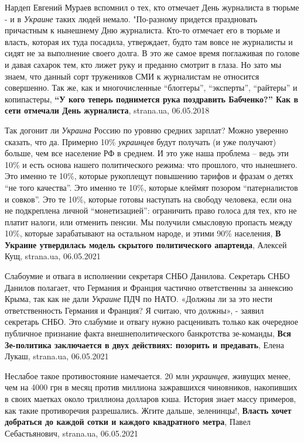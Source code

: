 Нардеп Евгений Мураев вспомнил о тех, кто отмечает День журналиста в тюрьме - и
в \emph{Украине} таких людей немало.  "По-разному придется праздновать
причастным к нынешнему Дню журналиста. Кто-то отмечает его в тюрьме и власть,
которая их туда посадила, утверждает, будто там вовсе не журналисты и сидят не
за выполнение своего долга. В это же самое время поглаживая по голове и давая
сахарок тем, кто лижет руку и преданно смотрит в глаза. Но зато мы знаем, что
данный сорт тружеников СМИ к журналистам не относится совершенно. Так же, как и
многочисленные \enquote{блоггеры}, \enquote{эксперты}, \enquote{райтеры} и копипастеры,
\textbf{\enquote{У кого теперь поднимется рука поздравить Бабченко?} Как в сети отмечали День журналиста},
strana.ua, 06.05.2018

Так догонит ли \emph{Украина} Россию по уровню средних зарплат?  Можно уверенно
сказать, что да.  Примерно 10\% \emph{украинцев} будут получать (и уже получают)
больше, чем все население РФ в среднем.  И это уже наша проблема – ведь эти 10\%
и есть основа нашего политического режима: что прошлого, что нынешнего.  Это
именно те 10\%, которые рукоплещут повышению тарифов и фразам о детях
\enquote{не того качества}.  Это именно те 10\%, которые клеймят позором
\enquote{патерналистов и совков}.  Это те 10\%, которые готовы наступать на
свободу человека, если она не подкреплена личной \enquote{монетизацией}: ограничить
право голоса для тех, кто не платит налоги, или отменить пенсии.  Мы получили
смысловую пропасть между 10\%, которые зарабатывают на остальном народе, и этими
90\% населения,
\textbf{В Украине утвердилась модель скрытого политического апартеида}, Алексей Кущ, strana.ua, 06.05.2021

Слабоумие и отвага в исполнении секретаря СНБО Данилова. Секретарь СНБО Данилов
полагает, что Германия и Франция частично ответственны за аннексию Крыма, так
как не дали \emph{Украине} ПДЧ по НАТО.  «Должны ли за это нести
ответственность Германия и Франция? Я считаю, что должны», - заявил секретарь
СНБО.  Это слабумие и отвагу нужно расценивать только как очередное публичное
признание факта внешнеполитического банкротства зе-команды,
\textbf{Вся Зе-политика заключается в двух действиях: позорить и предавать},
Елена Лукаш, strana.ua, 06.05.2021

Неслабое такое противостояние намечается. 20 млн \emph{украинцев}, живущих
менее, чем на 4000 грн в месяц против миллиона зажравшихся чиновников,
накопивших в своих маетках около триллиона долларов кэша. История знает массу
примеров, как такие противоречия разрешались. Жгите дальше, зеленинцы!, 
\textbf{Власть хочет добраться до каждой сотки и каждого квадратного метра},
Павел Себастьянович, strana.ua, 06.05.2021

